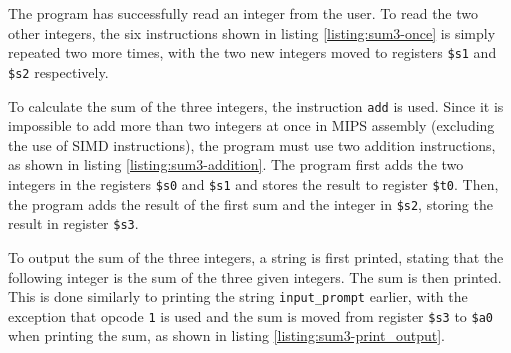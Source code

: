 \documentclass[11pt]{report}
\begin{document}
The program has successfully read an integer from the user. To read the two other integers, the six
instructions shown in listing \ref{listing:sum3-once} is simply repeated two more times, with the
two new integers moved to registers \verb|$s1| and \verb|$s2| respectively.

\newpage


To calculate the sum of the three integers, the instruction \verb|add| is used. Since it is
impossible to add more than two integers at once in MIPS assembly (excluding the use of SIMD
instructions), the program must use two addition instructions, as shown in listing
\ref{listing:sum3-addition}. The program first adds the two integers in the registers \verb|$s0| and
\verb|$s1| and stores the result to register \verb|$t0|. Then, the program adds the result of the
first sum and the integer in \verb|$s2|, storing the result in register \verb|$s3|.


To output the sum of the three integers, a string is first printed, stating that the following
integer is the sum of the three given integers. The sum is then printed. This is done similarly
to printing the string \verb|input_prompt| earlier, with the exception that opcode \verb|1| is used
and the sum is moved from register \verb|$s3| to \verb|$a0| when printing the sum, as shown in
listing \ref{listing:sum3-print_output}.

\newpage

\end{document}
